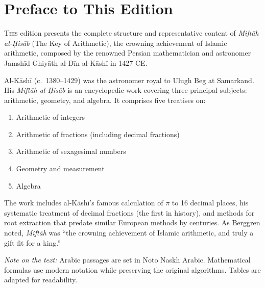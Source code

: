 \documentclass[11pt,a4paper]{article}
\begin{document}
\tableofcontents
\clearpage

\section*{Preface to This Edition}

\lettrine[lines=3, nindent=0em, findent=3pt]{\color{chapcolor}T}{his}
edition presents the complete structure and representative content of
\textit{Mift\=ah al-\d{H}is\=ab} (The Key of Arithmetic), the crowning
achievement of Islamic arithmetic, composed by the renowned Persian
mathematician and astronomer Jamsh\=id Ghiy\=ath al-D\=in al-K\=ash\=i in 1427 CE.

Al-K\=ash\=i (c.\ 1380--1429) was the astronomer royal to Ulugh Beg at
Samarkand. His \textit{Mift\=ah al-\d{H}is\=ab} is an encyclopedic work covering
three principal subjects: arithmetic, geometry, and algebra. It comprises
five treatises on:
\begin{enumerate}[nosep]
  \item Arithmetic of integers
  \item Arithmetic of fractions (including decimal fractions)
  \item Arithmetic of sexagesimal numbers
  \item Geometry and measurement
  \item Algebra
\end{enumerate}

The work includes al-K\=ash\=i's famous calculation of $\pi$ to 16 decimal
places, his systematic treatment of decimal fractions (the first in
history), and methods for root extraction that predate similar European
methods by centuries. As Berggren noted, \textit{Mift\=ah} was ``the
crowning achievement of Islamic arithmetic, and truly a gift fit for a
king.''

\vspace{0.5cm}
\noindent\textit{Note on the text:} Arabic passages are set in Noto Naskh
Arabic. Mathematical formulas use modern notation while preserving the
original algorithms. Tables are adapted for readability.
\clearpage
\end{document}
